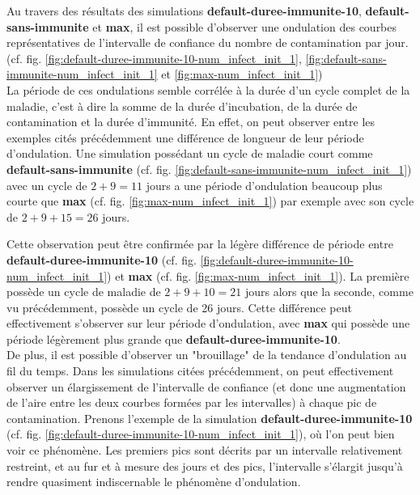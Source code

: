 \documentclass[12pt,french,titlepage]{article}
\begin{document}
Au travers des résultats des simulations \textbf{default-duree-immunite-10}, \textbf{default-sans-immunite} et \textbf{max}, il est possible d'observer une ondulation des courbes représentatives de l'intervalle de confiance du nombre de contamination par jour. (cf. fig. \ref{fig:default-duree-immunite-10-num_infect_init_1}, \ref{fig:default-sans-immunite-num_infect_init_1} et \ref{fig:max-num_infect_init_1})\\

La période de ces ondulations semble corrélée à la durée d'un cycle complet de la maladie, c'est à dire la somme de la durée d'incubation, de la durée de contamination et la durée d'immunité. En effet, on peut observer entre les exemples cités précédemment une différence de longueur de leur période d'ondulation. Une simulation possédant un cycle de maladie court comme \textbf{default-sans-immunite} (cf. fig. \ref{fig:default-sans-immunite-num_infect_init_1}) avec un cycle de $2+9 = 11$ jours a une période d'ondulation beaucoup plus courte que \textbf{max} (cf. fig. \ref{fig:max-num_infect_init_1}) par exemple avec son cycle de $2+9+15 = 26$ jours.

Cette observation peut être confirmée par la légère différence de période entre \textbf{default-duree-immunite-10} (cf. fig. \ref{fig:default-duree-immunite-10-num_infect_init_1}) et \textbf{max} (cf. fig. \ref{fig:max-num_infect_init_1}). La première possède un cycle de maladie de $2+9+10 = 21$ jours alors que la seconde, comme vu précédemment, possède un cycle de 26 jours. Cette différence peut effectivement s'observer sur leur période d'ondulation, avec \textbf{max} qui possède une période légèrement plus grande que \textbf{default-duree-immunite-10}.\\

De plus, il est possible d'observer un "brouillage" de la tendance d'ondulation au fil du temps. Dans les simulations citées précédemment, on peut effectivement observer un élargissement de l'intervalle de confiance (et donc une augmentation de l'aire entre les deux courbes formées par les intervalles) à chaque pic de contamination. Prenons l'exemple de la simulation \textbf{default-duree-immunite-10} (cf. fig. \ref{fig:default-duree-immunite-10-num_infect_init_1}), où l'on peut bien voir ce phénomène. Les premiers pics sont décrits par un intervalle relativement restreint, et au fur et à mesure des jours et des pics, l'intervalle s'élargit jusqu'à rendre quasiment indiscernable le phénomène d'ondulation.
\end{document}
